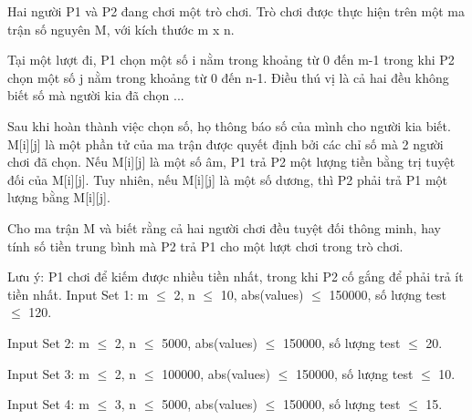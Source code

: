 Hai người P1 và P2 đang chơi một trò chơi. Trò chơi được thực hiện trên một ma trận số nguyên M, với kích thước m x n.  

   Tại một lượt đi, P1 chọn một số i nằm trong khoảng từ 0 đến m-1 trong khi P2 chọn một số j nằm trong khoảng từ 0 đến n-1. Điều thú vị là cả hai đều không biết số mà người kia đã chọn ...  

   Sau khi hoàn thành việc chọn số, họ thông báo số của mình cho người kia biết. M[i][j] là một phần tử của ma trận được quyết định bởi các chỉ số mà 2 người chơi đã chọn. Nếu M[i][j] là một số âm, P1 trả P2 một lượng tiền bằng trị tuyệt đối của M[i][j]. Tuy nhiên, nếu M[i][j] là một số dương, thì P2 phải trả P1 một lượng bằng M[i][j].  

   Cho ma trận M và biết rằng cả hai người chơi đều tuyệt đối thông minh, hay tính số tiền trung bình mà P2 trả P1 cho một lượt chơi trong trò chơi.  

   Lưu ý: P1 chơi để kiếm được nhiều tiền nhất, trong khi P2 cố gắng để phải trả ít tiền nhất.
Input Set 1: m  $\le$  2, n  $\le$  10, abs(values)  $\le$  150000, số lượng test  $\le$  120.  

   Input Set 2: m  $\le$  2, n  $\le$  5000, abs(values)  $\le$  150000, số lượng test  $\le$  20.  

   Input Set 3: m  $\le$  2, n  $\le$  100000, abs(values)  $\le$  150000, số lượng test  $\le$  10.  

   Input Set 4: m  $\le$  3, n  $\le$  5000, abs(values)  $\le$  150000, số lượng test  $\le$  15.